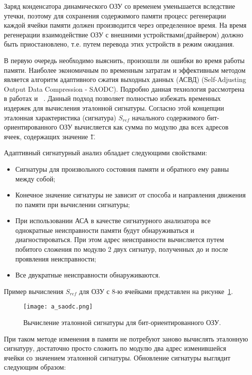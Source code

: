 Заряд конденсатора динамического ОЗУ со временем уменьшается вследствие утечки, поэтому для сохранения содержимого памяти процесс регенерации каждой ячейки памяти должен производится через определенное время. На время регенерации взаимодействие ОЗУ с внешними устройствами(драйвером) должно быть приостановлено, т.е. путем перевода этих устройств в режим ожидания.

В первую очередь необходимо выяснить, произошли ли ошибки во время работы памяти. Наиболее экономичным по временным затратам и эффективным методом является алгоритм адаптивного сжатия выходных данных (АСВД) (Self-Adjusting Output Data Compression - SAODC). Подробно данная технология рассмотрена в работах \cite{SAODC_Ivaniuk} и ~\cite{SAODC_Yarmolik}. Данный подход позволяет полностью избежать временных издержек для вычисления эталонной сигнатуры. Согласно этой концепции эталонная характеристика (сигнатура) $S_{ref}$ начального содержимого бит-ориентированного ОЗУ вычисляется как сумма по модулю два всех адресов ячеек, содержащих значение \"1\". 

Адаптивный сигнатурный анализ обладает следующими свойствами\cite{March_Tests_Ivaniuk}:
\begin{itemize}
  \item Сигнатуры для произвольного состояния памяти и обратного ему равны между собой;
  \item Конечное значение сигнатуры не зависит от способа и направления движения по памяти при вычислении сигнатуры;
  \item При использовании АСА в качестве сигнатурного анализатора все однократные неисправности памяти будут обнаруживаться и диагностироваться. При этом адрес неисправности вычисляется путем побитого сложения по модулю 2 двух сигнатур, полученных до и после проявления неисправности;
  \item Все двукратные неисправности обнаруживаются.
\end{itemize}

Пример вычисления $S_{ref}$ для ОЗУ с 8-ю ячейками представлен на рисунке~\ref{fig:arch_and_mod:memory_refresh:saodc}.

\begin{figure}[ht]
\centering
  \texttt{[image: a\_saodc.png]}  
  \caption{ Вычисление эталонной сигнатуры для бит-ориентированного ОЗУ.}
  \label{fig:arch_and_mod:memory_refresh:saodc}
\end{figure}

При таком методе изменения в памяти не потребуют заново вычислять эталонную сигнатуру, достаточно просто сложить по модулю два адрес изменившейся ячейки со значением эталонной сигнатуры. Обновление сигнатуры выглядит следующим образом:

